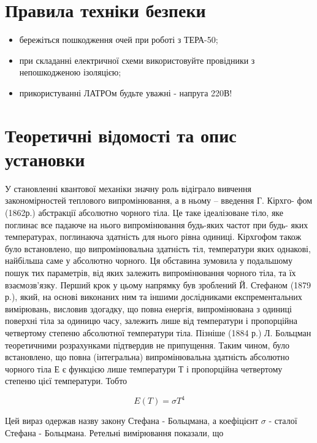 \documentclass[twocolumn]{el-author}
\begin{document}
\section{Правила техніки безпеки}

\begin{itemize}
	\item  бережіться пошкодження очей при роботі з ТЕРА-50;
	\item  при складанні електричної схеми використовуйте провідники
		з непошкодженою ізоляцією;
	\item  прикористуванні ЛАТРОм будьте уважні - напруга 220В!
\end{itemize}

\section{Теоретичні відомості та опис установки}

У становленні квантової механіки значну роль відіграло вивчення
закономірностей теплового випромінювання, а в ньому -- введення Г. Кірхго-
фом (1862р.) абстракції абсолютно чорного тіла. Це таке ідеалізоване тіло, яке
поглинає все падаюче на нього випромінювання будь-яких частот при будь-
яких температурах, поглинаюча здатність для нього рівна одиниці. Кірхгофом
також було встановлено, що випромінювальна здатність тіл, температури яких
однакові, найбільша саме у абсолютно чорного. Ця обставина зумовила у
подальшому пошук тих параметрів, від яких залежить випромінювання чорного
тіла, та їх взаємозв'язку. Перший крок у цьому напрямку був зроблений
Й. Стефаном (1879 р.), який, на основі виконаних ним та іншими дослідниками
експрементальних вимірювань, висловив здогадку, що повна енергія,
випромінювана з одиниці поверхні тіла за одиницю часу, залежить лише від
температури і пропорційна четвертому степеню абсолютної температури тіла.
Пізніше (1884 р.) Л. Больцман теоретичними розрахунками підтвердив не
припущення. Таким чином, було встановлено, що повна (інтегральна)
випромінювальна здатність абсолютно чорного тіла Е є функцією лише
температури Т і пропорційна четвертому степеню цієї температури. Тобто

\begin{equation} \label{eq:Stefan_Boltzmann}
E(T) = \sigma T^{4}
\end{equation}

Цей вираз одержав назву закону Стефана - Больцмана, а коефіцієнт $\sigma$
- сталої Стефана - Больцмана. Ретельні вимірювання показали, що
\end{document}
